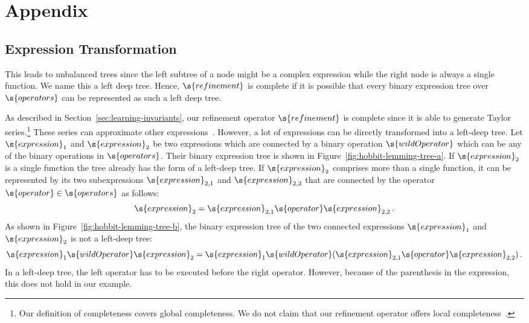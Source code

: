\chapter{Appendix}

\section{Expression Transformation}
\label{sec:ap-lemming-expressions}

This leads to unbalanced trees since the left subtree of a node might be a complex expression while the right node is always a single function. We name this a left deep tree. Hence, $\s{refinement}$ is complete if it is possible that every binary expression tree over $\s{operators}$ can be represented as such a left deep tree. 

As described in Section~\ref{sec:learning-invariants}, our refinement operator $\s{refinement}$ is complete since it is able to generate Taylor series.\footnote{Our definition of completeness covers global completeness. We do not claim that our refinement operator offers local completeness~\cite{Muggleton1994}.} These series can approximate other expressions~\cite{Weltner2008}.
However, a lot of expressions can be directly transformed into a left-deep tree.
Let $\s{expression}_1$ and $\s{expression}_2$ be two expressions which are connected by a binary operation $\s{wildOperator}$ which can be any of the binary operations in $\s{operators}$. Their binary expression tree is shown in Figure~\ref{fig:hobbit-lemming-tree-a}. If $\s{expression}_2$ is a single function the tree already has the form of a left-deep tree. If $\s{expression}_2$ comprises more than a single function, it can be represented by its two subexpressions $\s{expression}_{2,1}$ and $\s{expression}_{2,2}$ that are connected by the operator $\s{operator} \in \s{operators}$ as follows:
\begin{equation}
\s{expression}_2 = \s{expression}_{2,1} \s{operator} \s{expression}_{2,2}\,.
\end{equation}
As shown in Figure~\ref{fig:hobbit-lemming-tree-b}, the binary expression tree of the two connected expressions $\s{expression}_1$ and $\s{expression}_2$ is not a left-deep tree:
\begin{equation}
\s{expression}_1 \s{wildOperator} \s{expression}_2 = \s{expression}_1 \s{wildOperator} (\s{expression}_{2,1} \s{operator} \s{expression}_{2,2})\,.
\end{equation}
In a left-deep tree, the left operator has to be executed before the right operator. However, because of the parenthesis in the expression, this does not hold in our example.

